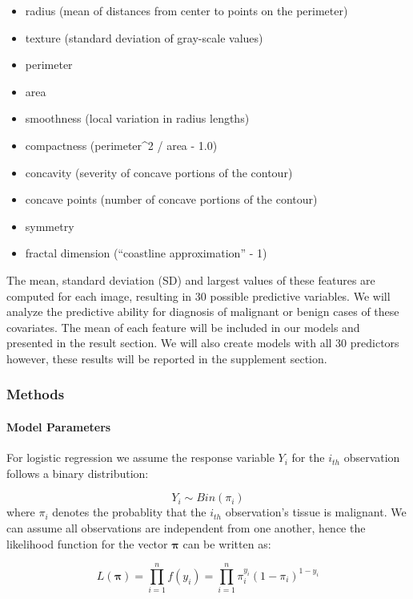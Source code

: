 \documentclass[]{article}
\providecommand{\tightlist}{%
  \setlength{\itemsep}{0pt}\setlength{\parskip}{0pt}}
\let\oldparagraph\paragraph
\renewcommand{\paragraph}[1]{\oldparagraph{#1}\mbox{}}
\begin{document}
\begin{itemize}
\tightlist
\item
  radius (mean of distances from center to points on the perimeter)
\item
  texture (standard deviation of gray-scale values)
\item
  perimeter
\item
  area
\item
  smoothness (local variation in radius lengths)
\item
  compactness (perimeter\^{}2 / area - 1.0)
\item
  concavity (severity of concave portions of the contour)
\item
  concave points (number of concave portions of the contour)
\item
  symmetry
\item
  fractal dimension (``coastline approximation'' - 1)
\end{itemize}

The mean, standard deviation (SD) and largest values of these features
are computed for each image, resulting in 30 possible predictive
variables. We will analyze the predictive ability for diagnosis of
malignant or benign cases of these covariates. The mean of each feature
will be included in our models and presented in the result section. We
will also create models with all 30 predictors however, these results
will be reported in the supplement section.

\hypertarget{methods}{%
\subsubsection{Methods}\label{methods}}

\hypertarget{model-parameters}{%
\paragraph{Model Parameters}\label{model-parameters}}

For logistic regression we assume the response variable \(Y_i\) for the
\(i_{th}\) observation follows a binary distribution:

\[Y_i\sim Bin(\pi_i)\] where \(\pi_i\) denotes the probablity that the
\(i_{th}\) observation's tissue is malignant. We can assume all
observations are independent from one another, hence the likelihood
function for the vector \(\boldsymbol\pi\) can be written as:

\[L(\boldsymbol\pi)=\prod_{i=1}^n f(y_i)=\prod_{i=1}^n\pi_i^{y_i}(1 - \pi_i)^{1-y_i}\]
\end{document}
